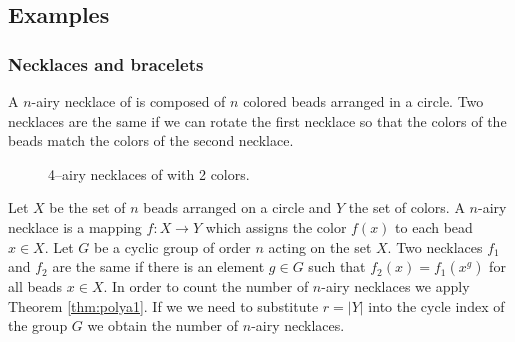 \documentclass[11pt]{article}
\begin{document}
\subsection{Examples}

\subsubsection{Necklaces and bracelets}

A $n$-airy necklace of is composed of $n$ colored beads arranged in a
circle. Two necklaces are the same if we can rotate the first necklace
so that the colors of the beads match the colors of the second
necklace.

\begin{figure}
\begin{center}
\end{center}
\caption{4--airy necklaces of with 2 colors.}
\label{fig:necklaces2}
\end{figure}

Let $X$ be the set of $n$ beads arranged on a circle and $Y$ the set
of colors. A $n$-airy necklace is a mapping $f:X\to Y$ which assigns
the color $f(x)$ to each bead $x\in X$. Let $G$ be a cyclic group of
order $n$ acting on the set $X$. Two necklaces $f_1$ and $f_2$ are the
same if there is an element $g\in G$ such that $f_2(x)=f_1(x^g)$ for
all beads $x\in X$. In order to count the number of $n$-airy necklaces
we apply Theorem \ref{thm:polya1}. If we we need to substitute $r=|Y|$
into the cycle index of the group $G$ we obtain the number of $n$-airy
necklaces.
\end{document}

